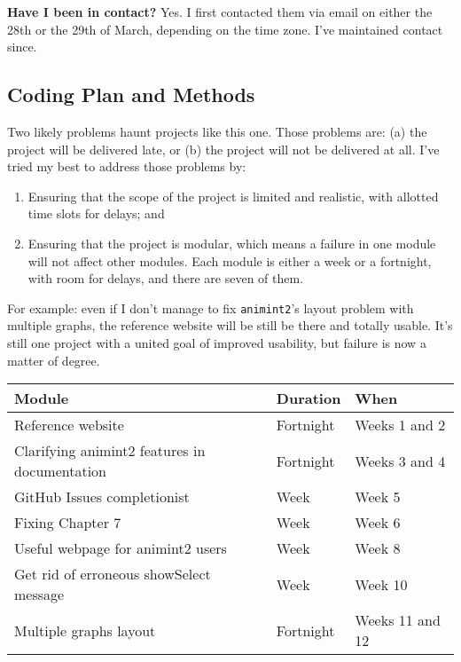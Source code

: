 \documentclass[
]{article}
\providecommand{\tightlist}{%
  \setlength{\itemsep}{0pt}\setlength{\parskip}{0pt}}\usepackage{longtable,booktabs,array}
\begin{document}
\textbf{Have I been in contact?} Yes. I first contacted them via email
on either the 28th or the 29th of March, depending on the time zone.
I've maintained contact since.

\hypertarget{coding-plan-and-methods}{%
\subsection{Coding Plan and Methods}\label{coding-plan-and-methods}}

Two likely problems haunt projects like this one. Those problems are:
(a) the project will be delivered late, or (b) the project will not be
delivered at all. I've tried my best to address those problems by:

\begin{enumerate}
\def\labelenumi{\alph{enumi}.}
\tightlist
\item
  Ensuring that the scope of the project is limited and realistic, with
  allotted time slots for delays; and
\item
  Ensuring that the project is modular, which means a failure in one
  module will not affect other modules. Each module is either a week or
  a fortnight, with room for delays, and there are seven of them.
\end{enumerate}

For example: even if I don't manage to fix \texttt{animint2}'s layout
problem with multiple graphs, the reference website will be still be
there and totally usable. It's still one project with a united goal of
improved usability, but failure is now a matter of degree.

\begin{table}[b]
\begin{tabular}{@{}lll@{}}
\toprule
Module & Duration & When \\ \midrule
Reference website & Fortnight & Weeks 1 and 2 \\
Clarifying animint2 features in documentation & Fortnight & Weeks 3 and 4 \\
GitHub Issues completionist & Week & Week 5 \\
Fixing Chapter 7 & Week & Week 6 \\
Useful webpage for animint2 users & Week & Week 8 \\
Get rid of erroneous showSelect message & Week & Week 10 \\
Multiple graphs layout & Fortnight & Weeks 11 and 12 \\ \bottomrule
\end{tabular}
\end{table}
\end{document}
